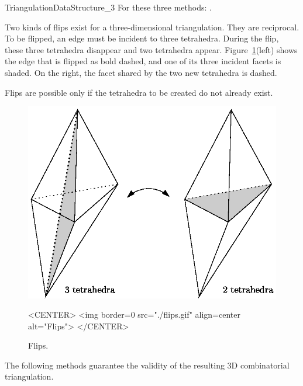 \begin{ccRefConcept}{TriangulationDataStructure_3}
{}
\ccGlue
{}
{}
\ccGlue
{}
{For these three methods: .}


Two kinds of flips exist for a three-dimensional triangulation. They
are reciprocal. To be flipped, an edge must be incident to three
tetrahedra. During the flip, these three tetrahedra disappear and two
tetrahedra appear. Figure~\ref{TDS3-fig-flips}(left) shows the
edge that is flipped as bold dashed, and one of its three incident
facets is shaded. On the right, the facet shared by the two new
tetrahedra is dashed. 

Flips are possible only if the tetrahedra to be created do not already 
exist.

\begin{figure}
\begin{ccTexOnly}
\begin{center} 
\includegraphics{flips.eps}
\end{center}
\end{ccTexOnly}
\caption{Flips.
\label{TDS3-fig-flips}}
\begin{ccHtmlOnly}
<CENTER>
<img border=0 src="./flips.gif" align=center
alt="Flips">
</CENTER>
\end{ccHtmlOnly}
\end{figure} 

The following methods guarantee the validity of the resulting 3D
combinatorial triangulation.


\end{ccRefConcept}
